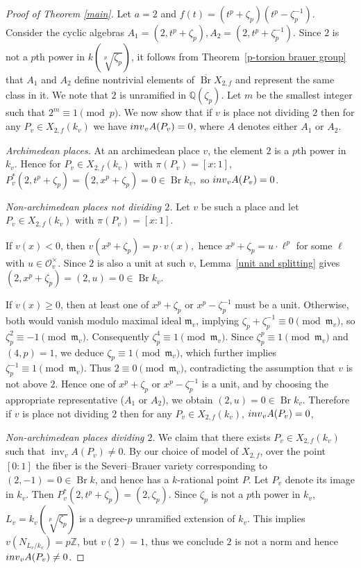 \documentclass[11pt]{amsart}
\theoremstyle{plain}
\theoremstyle{definition}
\newcommand{\inv}{{\rm inv}}
\newcommand{\Q}{{\mathbb Q}}
\newcommand{\Z}{{\mathbb Z}}
\DeclareMathOperator{\Br}{Br}
\begin{document}
\begin{proof}[{Proof of Theorem \ref{main}}]
Let $a=2$ and $f(t)=(t^p+\zeta_p)(t^p-\zeta_p^{-1}).$
Consider the cyclic algebras $A_1=(2,t^p+\zeta_p), A_2=(2,t^p+\zeta_p^{-1}).$ Since $2$ is not a $p$th power in $k(\sqrt[p]{\zeta_p})$, it follows from Theorem~\ref{p-torsion  brauer group} that $A_1$ and $A_2$ define nontrivial elements of $\overline{\Br}X_{2,f}$ and represent the same class in it. We note that $2$ is unramified in $\Q(\zeta_p)$. Let $m$ be the smallest integer such that $2^m\equiv1\pmod{p}$.
We now show that if $v$ is place not dividing $2$ then for any $P_v \in X_{2,f}(k_v)$ we have $\inv_v A(P_v)=0$, where $A$ denotes either $A_1$ or $A_2$.

    \emph{Archimedean places.}  
    At an archimedean place $v$, the element $2$ is a $p$th power in $k_v$. 
    Hence for $P_v \in X_{2,f}(k_v)$ with $\pi(P_v)=[x:1]$,
    $ P_v^*(2,t^p+\zeta_p) = (2,x^p+\zeta_p) = 0 \in \Br k_v,$ so $\inv_v A(P_v)=0$.
    
    \emph{Non-archimedean places not dividing $2$.}  
    Let $v$ be such a place and let $P_v \in X_{2,f}(k_v)$ with $\pi(P_v)=[x:1]$.
    
        If $v(x)<0$, then $v(x^p+\zeta_p)=p\cdot v(x),$ hence $x^p+\zeta_p = u \cdot \ell^p$ for some \(\ell\) with $u \in \mathcal{O}_v^\times$. 
        Since $2$ is also a unit at such $v$, Lemma~\ref{unit and splitting} gives $(2,x^p+\zeta_p)=(2,u)=0 \in \Br k_v.$

         If $v(x)\geq 0$, then at least one of $x^p+\zeta_p$ or $x^p-\zeta_p^{-1}$ must be a unit. Otherwise, both would vanish modulo maximal ideal $\mathfrak{m}_v$, implying $\zeta_p+\zeta_p^{-1}\equiv 0 \pmod{\mathfrak{m}_v}$, so $\zeta_p^2\equiv -1 \pmod{\mathfrak{m}_v}.$
        Consequently $\zeta_p^4 \equiv 1 \pmod{\mathfrak{m}_v}$. 
        Since $\zeta_p^p \equiv 1 \pmod{\mathfrak{m}_v}$ and $(4,p)=1$, we deduce 
        $\zeta_p \equiv 1 \pmod{\mathfrak{m}_v}$, which further implies 
        $\zeta_p^{-1}\equiv 1 \pmod{\mathfrak{m}_v}$. Thus $2\equiv0 \pmod{\mathfrak{m}_v}$, 
        contradicting the assumption that $v$ is not above $2$. 
        Hence one of $x^p+\zeta_p$ or $x^p-\zeta_p^{-1}$ is a unit, and by choosing the appropriate 
        representative ($A_1$ or $A_2$), we obtain $(2,u)=0 \in \Br k_v.$ Therefore if $v$ is place not dividing $2$ then for any $P_v \in X_{2,f}(k_v)$, $\inv_v A(P_v)=0$,

\emph{Non-archimedean places dividing $2$}. We claim that there exists $P_v \in X_{2,f}(k_v)$ such that $\operatorname{inv}_v A(P_v)\neq 0$. By our choice of model of $X_{2,f}$, over the point $[0:1]$ the fiber is the Severi--Brauer variety corresponding to $(2,-1)=0 \in \Br k$, and hence has a $k$-rational point $P$.  Let $P_v$ denote its image in $k_v$. Then $P_v^*(2,t^p+\zeta_p)=(2,\zeta_p)$. Since $\zeta_p$ is not a $p$th power in $k_v$, $L_v=k_v(\sqrt[p]{\zeta_p})$ is a degree-$p$ unramified extension of $k_v$.
This implies $v(N_{L_v/k_v})=p\Z$, but $v(2)=1$, thus we conclude $2$ is not a norm and hence $\inv_v A(P_v)\neq 0$.


\end{proof}
\end{document}
